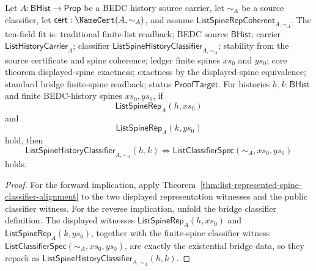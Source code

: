 \begin{theorem}
\label{thm:list-represented-spine-classifier-displayed-exactness}
Let $A:\mathsf{BHist}\to\mathsf{Prop}$ be a BEDC history source carrier, let
$\sim_A$ be a source classifier, let $\mathsf{cert}:\NameCert(A,\sim_A)$, and
assume $\mathsf{ListSpineRepCoherent}_{A,\sim_A}$. The ten-field fit is:
traditional finite-list readback; BEDC source $\mathsf{BHist}$; carrier
$\mathsf{ListHistoryCarrier}_A$; classifier
$\mathsf{ListSpineHistoryClassifier}_{A,\sim_A}$; stability from the source
certificate and spine coherence; ledger finite spines $xs_0$ and $ys_0$; core
theorem displayed-spine exactness; exactness by the displayed-spine
equivalence; standard bridge finite-spine readback; status
$\mathsf{ProofTarget}$. For histories $h,k:\mathsf{BHist}$ and finite
BEDC-history spines $xs_0,ys_0$, if
$$
\mathsf{ListSpineRep}_A(h,xs_0)
$$
and
$$
\mathsf{ListSpineRep}_A(k,ys_0)
$$
hold, then
$$
\mathsf{ListSpineHistoryClassifier}_{A,\sim_A}(h,k)
\Longleftrightarrow
\mathsf{ListClassifierSpec}(\sim_A,xs_0,ys_0)
$$
holds.
\end{theorem}
\begin{proof}
For the forward implication, apply
Theorem~\ref{thm:list-represented-spine-classifier-alignment} to the two
displayed representation witnesses and the public classifier witness. For the
reverse implication, unfold the bridge classifier definition. The displayed
witnesses $\mathsf{ListSpineRep}_A(h,xs_0)$ and
$\mathsf{ListSpineRep}_A(k,ys_0)$, together with the finite-spine classifier
witness $\mathsf{ListClassifierSpec}(\sim_A,xs_0,ys_0)$, are exactly the
existential bridge data, so they repack as
$\mathsf{ListSpineHistoryClassifier}_{A,\sim_A}(h,k)$.
\end{proof}

